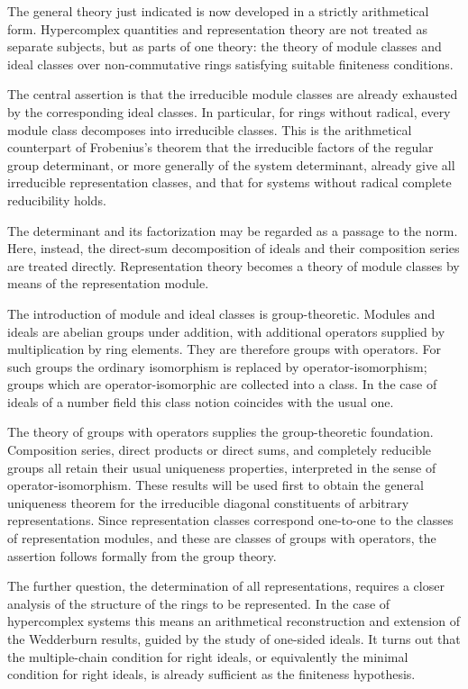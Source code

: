 \documentclass[11pt]{article}
\begin{document}
The general theory just indicated is now developed in a strictly
arithmetical form. Hypercomplex quantities and representation theory are
not treated as separate subjects, but as parts of one theory: the theory
of module classes and ideal classes over non-commutative rings
satisfying suitable finiteness conditions.

The central assertion is that the irreducible module classes are already
exhausted by the corresponding ideal classes. In particular, for rings
without radical, every module class decomposes into irreducible classes.
This is the arithmetical counterpart of Frobenius's theorem that the
irreducible factors of the regular group determinant, or more generally
of the system determinant, already give all irreducible representation
classes, and that for systems without radical complete reducibility
holds.

The determinant and its factorization may be regarded as a passage to
the norm. Here, instead, the direct-sum decomposition of ideals and
their composition series are treated directly. Representation theory
becomes a theory of module classes by means of the representation
module.

The introduction of module and ideal classes is group-theoretic. Modules
and ideals are abelian groups under addition, with additional operators
supplied by multiplication by ring elements. They are therefore groups
with operators. For such groups the ordinary isomorphism is replaced by
operator-isomorphism; groups which are operator-isomorphic are collected
into a class. In the case of ideals of a number field this class notion
coincides with the usual one.

The theory of groups with operators supplies the group-theoretic
foundation. Composition series, direct products or direct sums, and
completely reducible groups all retain their usual uniqueness
properties, interpreted in the sense of operator-isomorphism. These
results will be used first to obtain the general uniqueness theorem for
the irreducible diagonal constituents of arbitrary representations.
Since representation classes correspond one-to-one to the classes of
representation modules, and these are classes of groups with operators,
the assertion follows formally from the group theory.

The further question, the determination of all representations, requires
a closer analysis of the structure of the rings to be represented. In
the case of hypercomplex systems this means an arithmetical
reconstruction and extension of the Wedderburn results, guided by the
study of one-sided ideals. It turns out that the multiple-chain
condition for right ideals, or equivalently the minimal condition for
right ideals, is already sufficient as the finiteness hypothesis.
\end{document}
